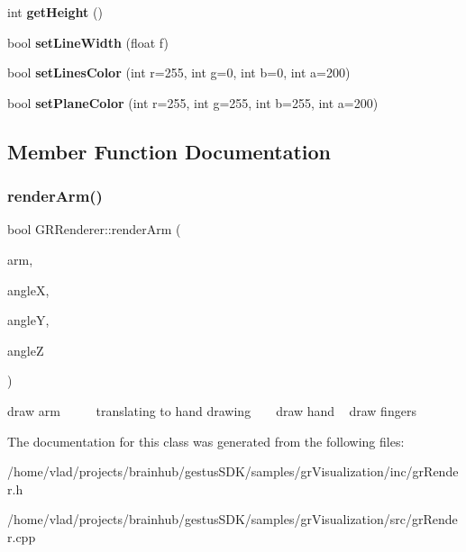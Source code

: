 \begin{DoxyCompactItemize}
int {\bfseries get\+Height} ()
\item 
\mbox{\label{classGRRenderer_ad98d078424c97e582890a9b91ff5a67e}} 
bool {\bfseries set\+Line\+Width} (float f)
\item 
\mbox{\label{classGRRenderer_a4024bbd950f9c1a2dceb276859c6a1b3}} 
bool {\bfseries set\+Lines\+Color} (int r=255, int g=0, int b=0, int a=200)
\item 
\mbox{\label{classGRRenderer_a4ac14e24760c8111ffc31c3f1750f59e}} 
bool {\bfseries set\+Plane\+Color} (int r=255, int g=255, int b=255, int a=200)
\end{DoxyCompactItemize}


\subsection{Member Function Documentation}
\mbox{\label{classGRRenderer_ad46d080a958497f815600edf60dee906}} 
\subsubsection{\texorpdfstring{render\+Arm()}{renderArm()}}
{\footnotesize\ttfamily bool G\+R\+Renderer\+::render\+Arm (\begin{DoxyParamCaption}\item[{struct \mbox{\hyperlink{structGRHandNode}{G\+R\+Hand\+Node}} $\ast$}]{arm,  }\item[{float}]{angleX,  }\item[{float}]{angleY,  }\item[{float}]{angleZ }\end{DoxyParamCaption})}

draw arm ~\newline
~\newline
~\newline
 translating to hand drawing ~\newline
~\newline
 draw hand ~\newline
 draw fingers 

The documentation for this class was generated from the following files\+:\begin{DoxyCompactItemize}
\item 
/home/vlad/projects/brainhub/gestus\+S\+D\+K/samples/gr\+Visualization/inc/gr\+Render.\+h\item 
/home/vlad/projects/brainhub/gestus\+S\+D\+K/samples/gr\+Visualization/src/gr\+Render.\+cpp\end{DoxyCompactItemize}
